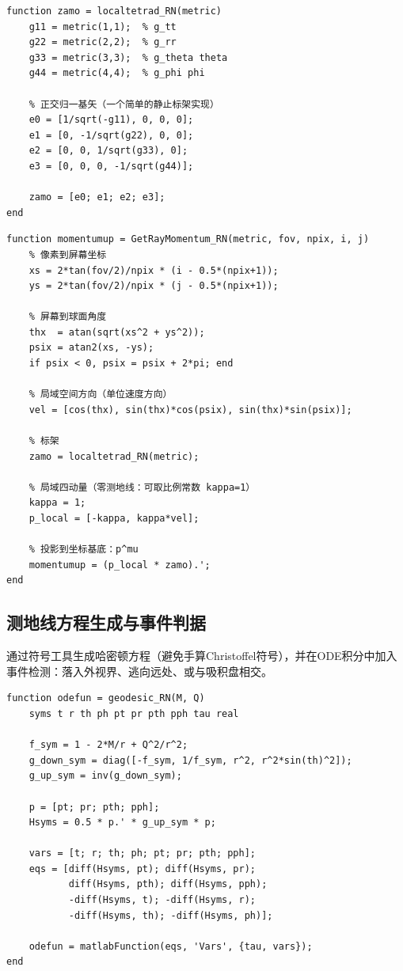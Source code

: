 \documentclass[a4paper,12pt]{article}
\begin{document}
\begin{lstlisting}[caption={局域正交标架 \texttt{localtetrad\_RN}}]
function zamo = localtetrad_RN(metric)
    g11 = metric(1,1);  % g_tt
    g22 = metric(2,2);  % g_rr
    g33 = metric(3,3);  % g_theta theta
    g44 = metric(4,4);  % g_phi phi

    % 正交归一基矢（一个简单的静止标架实现）
    e0 = [1/sqrt(-g11), 0, 0, 0];
    e1 = [0, -1/sqrt(g22), 0, 0];
    e2 = [0, 0, 1/sqrt(g33), 0];
    e3 = [0, 0, 0, -1/sqrt(g44)];

    zamo = [e0; e1; e2; e3];
end
\end{lstlisting}

\begin{lstlisting}[caption={像素到初始四动量映射 \texttt{GetRayMomentum\_RN}}]
function momentumup = GetRayMomentum_RN(metric, fov, npix, i, j)
    % 像素到屏幕坐标
    xs = 2*tan(fov/2)/npix * (i - 0.5*(npix+1));
    ys = 2*tan(fov/2)/npix * (j - 0.5*(npix+1));

    % 屏幕到球面角度
    thx  = atan(sqrt(xs^2 + ys^2));
    psix = atan2(xs, -ys);
    if psix < 0, psix = psix + 2*pi; end

    % 局域空间方向（单位速度方向）
    vel = [cos(thx), sin(thx)*cos(psix), sin(thx)*sin(psix)];

    % 标架
    zamo = localtetrad_RN(metric);

    % 局域四动量（零测地线：可取比例常数 kappa=1）
    kappa = 1;
    p_local = [-kappa, kappa*vel];

    % 投影到坐标基底：p^mu
    momentumup = (p_local * zamo).';
end
\end{lstlisting}

\subsection{测地线方程生成与事件判据}

通过符号工具生成哈密顿方程（避免手算Christoffel符号），并在ODE积分中加入事件检测：落入外视界、逃向远处、或与吸积盘相交。

\begin{lstlisting}[caption={测地线方程生成 \texttt{geodesic\_RN}}]
function odefun = geodesic_RN(M, Q)
    syms t r th ph pt pr pth pph tau real

    f_sym = 1 - 2*M/r + Q^2/r^2;
    g_down_sym = diag([-f_sym, 1/f_sym, r^2, r^2*sin(th)^2]);
    g_up_sym = inv(g_down_sym);

    p = [pt; pr; pth; pph];
    Hsyms = 0.5 * p.' * g_up_sym * p;

    vars = [t; r; th; ph; pt; pr; pth; pph];
    eqs = [diff(Hsyms, pt); diff(Hsyms, pr);
           diff(Hsyms, pth); diff(Hsyms, pph);
           -diff(Hsyms, t); -diff(Hsyms, r);
           -diff(Hsyms, th); -diff(Hsyms, ph)];

    odefun = matlabFunction(eqs, 'Vars', {tau, vars});
end
\end{lstlisting}
\end{document}
